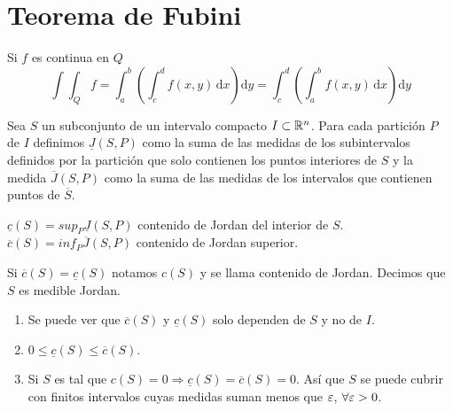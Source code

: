 \section{Teorema de Fubini}
\begin{corollary}[Fubini]
  Si $f$ es continua en $Q$ \begin{equation}
    \int\int_Q f = \int_a^b(\int_c^d f(x, y) \, \mathrm{d}x) \mathrm{d}y = \int_c^d(\int_a^b f(x, y)\, \mathrm{d}x)\mathrm{d}y
  \end{equation}
\end{corollary}

\begin{definition}
  Sea $S$ un subconjunto de un intervalo compacto $I \subset \mathbb{R}^n$. Para cada partición $P$ de $I$ definimos $\underline{J}(S, P)$ como la suma de las medidas de los subintervalos definidos por la partición que solo contienen los puntos interiores de $S$ y la medida $\overline{J}(S, P)$ como la suma de las medidas de los intervalos que contienen puntos de $\overline{S}$.
\end{definition}

\begin{definition}
  $\underline{c}(S) = sup_P \underline{J}(S, P)$ contenido de Jordan del interior de $S$.
  $\overline{c}(S) = inf_P \overline{J}(S, P)$ contenido de Jordan superior.
\end{definition}

\begin{definition}
  Si $\overline{c}(S) = \underline{c}(S)$ notamos $c(S)$ y se llama contenido de Jordan. Decimos que $S$ es medible Jordan.
\end{definition}

\begin{note}
  \begin{enumerate}
    \item Se puede ver que $\overline{c}(S)$ y $\underline{c}(S)$ solo dependen de $S$ y no de $I$.
    \item $0 \leq \underline{c}(S) \leq \overline{c}(S)$.
    \item Si $S$ es tal que $c(S) = 0 \Rightarrow \underline{c}(S) = \overline{c}(S) = 0$. Así que $S$ se puede cubrir con finitos intervalos cuyas medidas suman menos que $\varepsilon$, $\forall \varepsilon > 0$.
  \end{enumerate}
\end{note}
